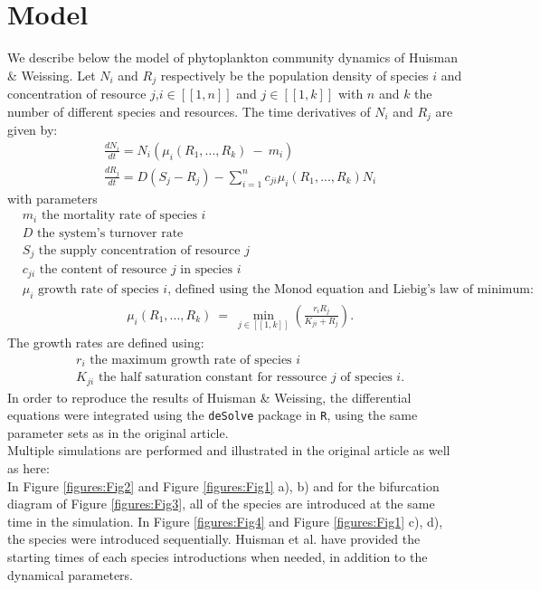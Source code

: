 \section{Model}
We describe below the model of phytoplankton community dynamics of Huisman \& Weissing\supercite{1999:Huisman}.
Let $N_i$ and $R_j$ respectively be the population density of species $i$ and concentration of resource 
$j$,$i\in[\![1,n]\!]$ and $j\in[\![1,k]\!]$ with $n$ and $k$ the number of 
different species and resources. The time derivatives of $N_i$ and $R_j$ are 
given by: \\
\begin{align}
	& \frac{dN_i}{dt}= N_i(\mu_i(R_1,...,R_k)~-~m_i)\\
	& \frac{dR_j}{dt}= D(S_j-R_j) - \sum_{i=1}^n c_{ji} 
\mu_i(R_1,...,R_k)N_i
\end{align}
with parameters
\begin{align*}
& m_i \text{ the mortality rate of species $i$}\\
& D \text{ the system's turnover rate}\\
& S_j \text{ the supply concentration of resource $j$}\\
& c_{ji} \text{ the content of resource $j$ in species $i$}\\
& \mu_i \text{ growth rate of species $i$, defined using the Monod equation and Liebig's law of minimum: }
\end{align*}
\begin{align}
&\mu_i(R_1,...,R_k)~=~\min_{j\in[\![1,k]\!]}(\frac{r_iR_j}{K_{ji}+R_j}). 
\end{align}
The growth rates are defined using: 
\begin{align*}
&r_i \text{ the maximum growth rate of species $i$}\\
&K_{	ji} \text{ the half saturation constant for ressource $j$ of species $i$.}
\end{align*}
In order to reproduce the results of Huisman \& Weissing, the differential 
equations were integrated using the \texttt{deSolve} package in \texttt{R}, using the same parameter 
sets as in the original article.\\

Multiple simulations are performed and illustrated in the original article as well as here: \\
In Figure \ref{figures:Fig2} and Figure \ref{figures:Fig1} a), b) and for the 
bifurcation diagram of Figure \ref{figures:Fig3}, all of the species are 
introduced at the same time in the simulation. In Figure \ref{figures:Fig4} and 
Figure \ref{figures:Fig1} c), d), the species were introduced sequentially. 
Huisman et al.\supercite{1999:Huisman} have provided the starting times 
of each species introductions when needed, in addition to the dynamical parameters.\\



